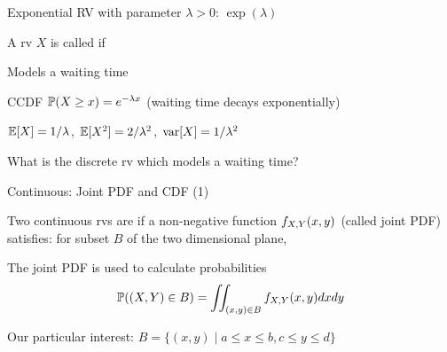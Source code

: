 \documentclass[handout,fleqn,aspectratio=169]{beamer}
\begin{document}
\begin{frame}{Exponential RV with parameter $\lambda >0$: $\exp(\lambda)$}

\plitemsep 0.02in
\bci 
\item<2-> A rv $X$ is called  if
\item<3-> Models a waiting time
\item<4-> CCDF $\mathbb{P}( X \ge x ) = e^{-\lambda x}$ (waiting time decays exponentially)
\item<5-> $\mathbb{E}[ X ] = 1/\lambda$, $\mathbb{E}[ X^2 ] = 2/\lambda^2$, $\text{var}[ X ] = 1/\lambda^2$
\item<6->  What is the discrete rv which models a waiting time?  
\eci 

\vspace{-0.5cm}
\raggedleft
{}

\end{frame}
\begin{frame}{Continuous: Joint PDF and CDF (1)}

{
Two continuous rvs are  if a non-negative function $f_{X,Y}(x,y)$ (called joint PDF) satisfies: for  subset $B$ of the two dimensional plane,
\vspace{-0.3cm}
}

\plitemsep 0.1in
\bce 
\item<3-> The joint PDF is used to calculate probabilities  
$$\mathbb{P}( (X,Y) \in B ) = \iint_{(x,y) \in B} f_{X,Y}(x,y) dx dy$$

Our particular interest: $B = \{(x,y) \mid a \le x \le b, c \le y \le d \}$
\ece

\end{frame}
\end{document}
